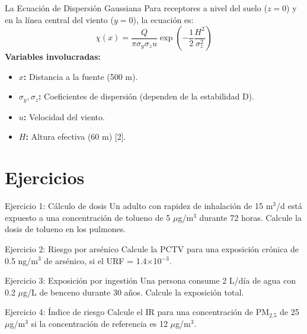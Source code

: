 \documentclass[10pt,compress]{beamer}
\begin{document}
\begin{frame}{La Ecuación de Dispersión Gaussiana}
    Para receptores a nivel del suelo ($z=0$) y en la línea central del viento ($y=0$), la ecuación es:
    \begin{equation*}
        \chi(x) = \frac{Q}{\pi \sigma_y \sigma_z u} \exp\left( -\frac{1}{2} \frac{H^2}{\sigma_z^2} \right)
    \end{equation*}
    \textbf{Variables involucradas:}
    \begin{itemize}
        \item \textbf{$x$:} Distancia a la fuente (500 m).
        \item \textbf{$\sigma_y, \sigma_z$:} Coeficientes de dispersión (dependen de la estabilidad D).
        \item \textbf{$u$:} Velocidad del viento.
        \item \textbf{$H$:} Altura efectiva (60 m) [2].
    \end{itemize}
\end{frame}



\section{Ejercicios}
\begin{frame}{Ejercicio 1: Cálculo de dosis}
Un adulto con rapidez de inhalación de 15 m$^3$/d está expuesto a una concentración de tolueno de 5 $\mu$g/m$^3$ durante 72 horas. Calcule la dosis de tolueno en los pulmones.
\end{frame}

\begin{frame}{Ejercicio 2: Riesgo por arsénico}
Calcule la PCTV para una exposición crónica de 0.5 ng/m$^3$ de arsénico, si el URF = 1.4×10$^{-3}$.
\end{frame}

\begin{frame}{Ejercicio 3: Exposición por ingestión}
Una persona consume 2 L/día de agua con 0.2 $\mu$g/L de benceno durante 30 años. Calcule la exposición total.
\end{frame}

\begin{frame}{Ejercicio 4: Índice de riesgo}
Calcule el IR para una concentración de PM$_{2.5}$ de 25 $\mu$g/m$^3$ si la concentración de referencia es 12 $\mu$g/m$^3$.
\end{frame}
\end{document}
